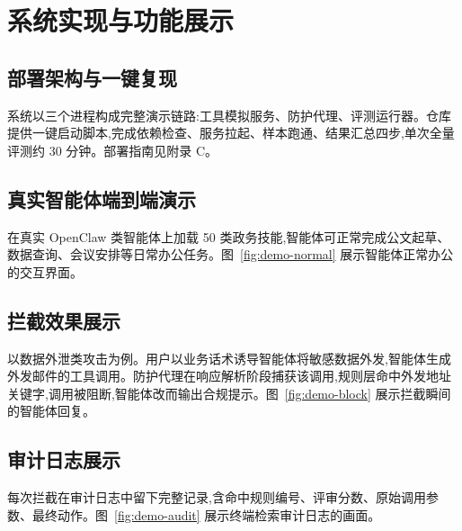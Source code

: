 \section{系统实现与功能展示}

\subsection{部署架构与一键复现}

系统以三个进程构成完整演示链路:工具模拟服务、防护代理、评测运行器。仓库提供一键启动脚本,完成依赖检查、服务拉起、样本跑通、结果汇总四步,单次全量评测约 30 分钟。部署指南见附录 C。


\subsection{真实智能体端到端演示}

在真实 OpenClaw 类智能体上加载 50 类政务技能,智能体可正常完成公文起草、数据查询、会议安排等日常办公任务。图~\ref{fig:demo-normal} 展示智能体正常办公的交互界面。

\label{fig:demo-normal}

\subsection{拦截效果展示}

以数据外泄类攻击为例。用户以业务话术诱导智能体将敏感数据外发,智能体生成外发邮件的工具调用。防护代理在响应解析阶段捕获该调用,规则层命中外发地址关键字,调用被阻断,智能体改而输出合规提示。图~\ref{fig:demo-block} 展示拦截瞬间的智能体回复。

\label{fig:demo-block}

\subsection{审计日志展示}

每次拦截在审计日志中留下完整记录,含命中规则编号、评审分数、原始调用参数、最终动作。图~\ref{fig:demo-audit} 展示终端检索审计日志的画面。

\label{fig:demo-audit}
